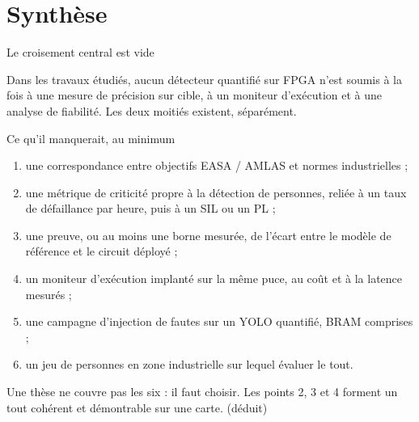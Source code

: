 \documentclass[aspectratio=169,11pt]{beamer}
\begin{document}
\section{Synthèse}

\begin{frame}{Le croisement central est vide}
  \centering

  \vspace{0.8em}
  \raggedright
  Dans les travaux étudiés, aucun détecteur quantifié sur FPGA n'est soumis à la fois à
  une mesure de précision sur cible, à un moniteur d'exécution et à une analyse de fiabilité.
  Les deux moitiés existent, séparément.
\end{frame}

\begin{frame}{Ce qu'il manquerait, au minimum}
  \begin{enumerate}
    \item une correspondance entre objectifs EASA / AMLAS et normes industrielles ;
    \item une métrique de criticité propre à la détection de personnes, reliée à un taux de
          défaillance par heure, puis à un SIL ou un PL ;
    \item une preuve, ou au moins une borne mesurée, de l'écart entre le modèle de référence
          et le circuit déployé ;
    \item un moniteur d'exécution implanté sur la même puce, au coût et à la latence mesurés ;
    \item une campagne d'injection de fautes sur un YOLO quantifié, BRAM comprises ;
    \item un jeu de personnes en zone industrielle sur lequel évaluer le tout.
  \end{enumerate}

  \vspace{0.4em}
  \small
  Une thèse ne couvre pas les six : il faut choisir. Les points 2, 3 et 4 forment un tout
  cohérent et démontrable sur une carte. {\scriptsize\color{acc}(déduit)}
\end{frame}
\end{document}
